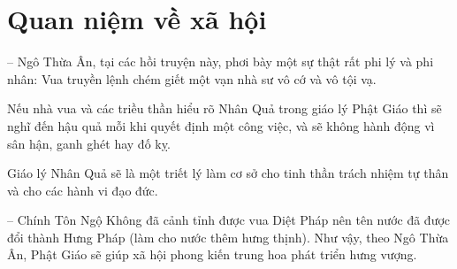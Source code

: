 \section{Quan niệm về xã hội} %
\label{sec:84_85_xa_hoi}

-- Ngô Thừa Ân, tại các hồi truyện này, phơi bày một sự thật rất phi lý và phi nhân: Vua truyền lệnh chém giết một vạn nhà sư vô cớ và vô tội vạ.

Nếu nhà vua và các triều thần hiểu rõ Nhân Quả trong giáo lý Phật Giáo thì sẽ nghĩ đến hậu quả mỗi khi quyết định một công việc, và sẽ không hành động vì sân hận, ganh ghét hay đố kỵ.

Giáo lý Nhân Quả sẽ là một triết lý làm cơ sở cho tinh thần trách nhiệm tự thân và cho các hành vi đạo đức.

-- Chính Tôn Ngộ Không đã cảnh tỉnh được vua Diệt Pháp nên tên nước đã được đổi thành Hưng Pháp (làm cho nước thêm hưng thịnh). Như vậy, theo Ngô Thừa Ân, Phật Giáo sẽ giúp xã hội phong kiến trung hoa phát triển hưng vượng.
